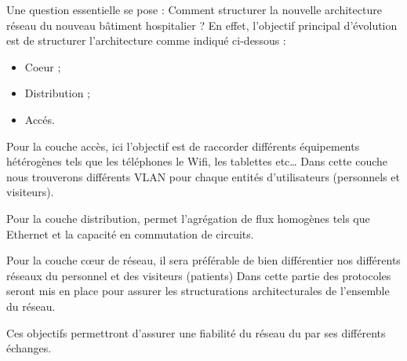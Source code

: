 



















Une question essentielle se pose : Comment structurer la nouvelle architecture réseau du nouveau bâtiment hospitalier ?
En effet, l’objectif principal d’évolution est de structurer l’architecture comme indiqué ci-dessous :
\begin{itemize}
\item Coeur ;
\item Distribution ;
\item Accés.
\end{itemize}
Pour la couche accès, ici l’objectif est de raccorder différents équipements hétérogènes tels que les téléphones le Wifi, les tablettes etc…
Dans cette couche nous trouverons différents VLAN pour chaque entités d’utilisateurs (personnels et visiteurs).

Pour la couche distribution, permet l’agrégation de flux homogènes tels que Ethernet et la capacité en commutation de circuits.

Pour la couche cœur de réseau, il sera préférable de bien différentier nos différents réseaux du personnel et des visiteurs (patients)
Dans cette partie des protocoles seront mis en place pour assurer les structurations architecturales de l’ensemble du réseau.

Ces objectifs permettront d’assurer une fiabilité du réseau du par ses différents échanges.


